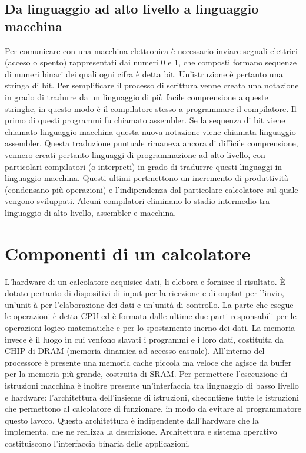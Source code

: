 \subsection{Da linguaggio ad alto livello a linguaggio macchina}
Per comunicare con una macchina elettronica \`e necessario inviare segnali elettrici (acceso o spento) rappresentati dai numeri $0$ e $1$, che composti formano sequenze di 
numeri binari dei quali ogni cifra \`e detta bit. Un'istruzione \`e pertanto una stringa di bit. Per semplificare il processo di scrittura venne creata una notazione in grado 
di tradurre da un linguaggio di pi\`u facile comprensione a queste stringhe, in questo modo \`e il compilatore stesso a programmare il compilatore. Il primo di questi 
programmi fu chiamato assembler. Se la sequenza di bit viene chiamato linguaggio macchina questa nuova notazione viene chiamata linguaggio assembler. Questa traduzione puntuale
rimaneva ancora di difficile comprensione, vennero creati pertanto linguaggi di programmazione ad alto livello, con particolari compilatori (o interpreti) in grado di tradurrre
questi linguaggi in linguaggio macchina. Questi ultimi pertmettono un incremento di produttivit\`a (condensano pi\`u operazioni) e l'indipendenza dal particolare calcolatore 
sul quale vengono sviluppati. Alcuni compilatori eliminano lo stadio intermedio tra linguaggio di alto livello, assembler e macchina. 
\section{Componenti di un calcolatore}
L'hardware di un calcolatore acquisice dati, li elebora e fornisce il risultato. \`E dotato pertanto di dispositivi di input per la ricezione e di ouptut per l'invio, un'unit
\`a per l'elaborazione dei dati e un'unit\`a di controllo. La parte che esegue le operazioni \`e detta CPU ed \`e formata dalle ultime due parti responsabili per le operazioni
logico-matematiche e per lo spostamento inerno dei dati. La memoria invece \`e il luogo in cui venfono slavati i programmi e i loro dati, costituita da CHIP di DRAM (memoria
dinamica ad accesso casuale). All'interno del processore \`e presente una memoria cache piccola ma veloce che agisce da buffer per la memoria pi\`u grande, costruita di SRAM.
Per permettere l'esecuzione di istruzioni macchina \`e inoltre presente un'interfaccia tra linguaggio di basso livello e hardware: l'architettura dell'insieme di istruzioni, 
checontiene tutte le istruzioni che permettono al calcolatore di funzionare, in modo da evitare al programmatore questo lavoro. Questa architettura \`e indipendente dall'hardware che la implementa, che ne realizza la descrizione. Architettura e sistema operativo costituiscono l'interfaccia binaria delle applicazioni. 
